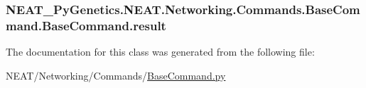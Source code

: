 \subsubsection[{\texorpdfstring{result}{result}}]{\setlength{\rightskip}{0pt plus 5cm}N\+E\+A\+T\+\_\+\+Py\+Genetics.\+N\+E\+A\+T.\+Networking.\+Commands.\+Base\+Command.\+Base\+Command.\+result}\hypertarget{classNEAT__PyGenetics_1_1NEAT_1_1Networking_1_1Commands_1_1BaseCommand_1_1BaseCommand_aa3136732344967769c806b465e699858}{}\label{classNEAT__PyGenetics_1_1NEAT_1_1Networking_1_1Commands_1_1BaseCommand_1_1BaseCommand_aa3136732344967769c806b465e699858}


The documentation for this class was generated from the following file\+:\begin{DoxyCompactItemize}
\item 
N\+E\+A\+T/\+Networking/\+Commands/\hyperlink{BaseCommand_8py}{Base\+Command.\+py}\end{DoxyCompactItemize}
